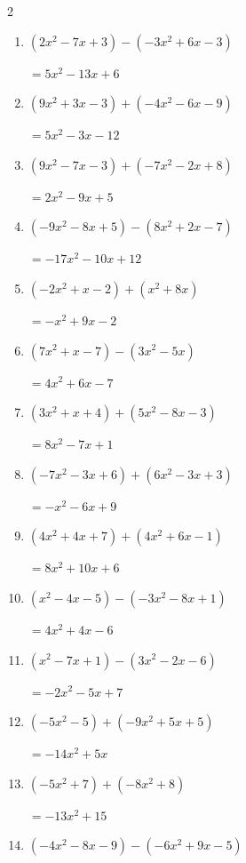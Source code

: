 \begin{multicols}{2}
\begin{enumerate}
\columnbreak %

\resetques

  \item $(2x^{2}-7x+3)-(-3x^{2}+6x-3)$

        $=5x^{2}-13x+6$

  \item $(9x^{2}+3x-3)+(-4x^{2}-6x-9)$

        $=5x^{2}-3x-12$

  \item $(9x^{2}-7x-3)+(-7x^{2}-2x+8)$

        $=2x^{2}-9x+5$

  \item $(-9x^{2}-8x+5)-(8x^{2}+2x-7)$

        $=-17x^{2}-10x+12$

  \item $(-2x^{2}+x-2)+(x^{2}+8x)$

        $=-x^{2}+9x-2$

  \item $(7x^{2}+x-7)-(3x^{2}-5x)$

        $=4x^{2}+6x-7$

  \item $(3x^{2}+x+4)+(5x^{2}-8x-3)$

        $=8x^{2}-7x+1$

  \item $(-7x^{2}-3x+6)+(6x^{2}-3x+3)$

        $=-x^{2}-6x+9$

  \item $(4x^{2}+4x+7)+(4x^{2}+6x-1)$

        $=8x^{2}+10x+6$

  \item $(x^{2}-4x-5)-(-3x^{2}-8x+1)$

        $=4x^{2}+4x-6$

  \item $(x^{2}-7x+1)-(3x^{2}-2x-6)$

        $=-2x^{2}-5x+7$

  \item $(-5x^{2}-5)+(-9x^{2}+5x+5)$

        $=-14x^{2}+5x$

  \item $(-5x^{2}+7)+(-8x^{2}+8)$

        $=-13x^{2}+15$

  \item $(-4x^{2}-8x-9)-(-6x^{2}+9x-5)$


\end{enumerate}
\end{multicols}
